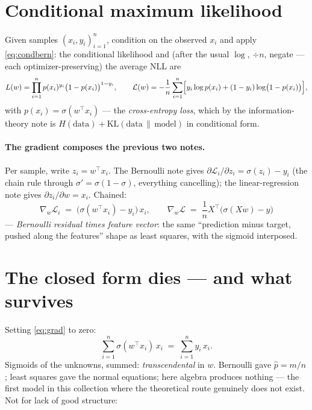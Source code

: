\documentclass[11pt]{article}
\newcommand{\sig}{\sigma}
\begin{document}
\section{Conditional maximum likelihood}

Given samples $(x_i, y_i)_{i=1}^n$, condition on the observed $x_i$ and
apply \eqref{eq:condbern}: the conditional likelihood and (after the
usual $\log$, $\div n$, negate --- each optimizer-preserving) the average
NLL are
\begin{equation}
  L(w) = \prod_{i=1}^n p(x_i)^{y_i}\bigl(1-p(x_i)\bigr)^{1-y_i},
  \qquad
  \mathcal{L}(w)
  = -\frac1n\sum_{i=1}^n
  \Bigl[y_i\log p(x_i) + (1-y_i)\log\bigl(1-p(x_i)\bigr)\Bigr],
  \label{eq:nll}
\end{equation}
with $p(x_i) = \sig(w^\top x_i)$ --- the \emph{cross-entropy loss},
which by the information-theory note is
$H(\text{data}) + \mathrm{KL}(\text{data}\,\|\,\text{model})$ in
conditional form.

\paragraph{The gradient composes the previous two notes.}
Per sample, write $z_i = w^\top x_i$. The Bernoulli note gives
$\partial \mathcal{L}_i/\partial z_i = \sig(z_i) - y_i$
(the chain rule through $\sig' = \sig(1-\sig)$, everything cancelling);
the linear-regression note gives $\partial z_i/\partial w = x_i$. Chained:
\begin{equation}
  \nabla_w \mathcal{L}_i
  \;=\; \bigl(\sig(w^\top x_i) - y_i\bigr)\, x_i ,
  \qquad
  \nabla_w \mathcal{L}
  \;=\; \frac1n X^\top\bigl(\sig(Xw) - y\bigr)
  \label{eq:grad}
\end{equation}
--- \emph{Bernoulli residual times feature vector}: the same
``prediction minus target, pushed along the features'' shape as least
squares, with the sigmoid interposed.

\section{The closed form dies --- and what survives}

Setting \eqref{eq:grad} to zero:
\begin{equation}
  \sum_{i=1}^n \sig(w^\top x_i)\, x_i \;=\; \sum_{i=1}^n y_i\, x_i .
  \label{eq:stationarity}
\end{equation}
Sigmoids of the unknowns, summed: \emph{transcendental} in $w$. Bernoulli
gave $\hat p = m/n$; least squares gave the normal equations; here
algebra produces nothing --- the first model in this collection where the
theoretical route genuinely does not exist. Not for lack of good
structure:
\end{document}
